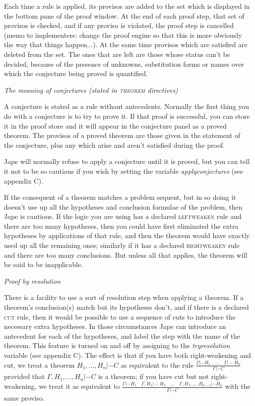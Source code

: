 \documentclass[11pt]{book}
\begin{document}
Each time a rule is applied, its provisos are added to the set which is displayed in the bottom pane of the proof window. At the end of each proof step, that set of provisos is checked, and if any proviso is violated, the proof step is cancelled (memo to implementers: change the proof engine so that this is more obviously the way that things happen...). At the same time provisos which are satisfied are deleted from the set. The ones that are left are those whose status can't be decided, because of the presence of unknowns, substitution forms or names over which the conjecture being proved is quantified.


\textit{The meaning of conjectures (stated in \textsc{theorem} directives)}


A conjecture is stated as a rule without antecedents. Normally the first thing you do with a conjecture is to try to prove it. If that proof is successful, you can store it in the proof store and it will appear in the conjecture panel as a proved theorem. The provisos of a proved theorem are those given in the statement of the conjecture, plus any which arise and aren't satisfied during the proof.


Jape will normally refuse to apply a conjecture until it is proved, but you can tell it not to be so cautious if you wish by setting the variable \textit{applyconjectures} (see appendix C).


If the consequent of a theorem matches a problem sequent, but in so doing it doesn't use up all the hypotheses and conclusion formulae of the problem, then Jape is cautious. If the logic you are using has a declared \textsc{leftweaken} rule and there are too many hypotheses, then you could have first eliminated the extra hypotheses by applications of that rule, and then the theorem would have exactly used up all the remaining ones; similarly if it has a declared \textsc{rightweaken} rule and there are too many conclusions. But unless all that applies, the theorem will be said to be inapplicable.


\textit{Proof by resolution}


There is a facility to use a sort of resolution step when applying a theorem. If a theorem's conclusion(s) match but its hypotheses don't, and if there is a declared \textsc{cut} rule, then it would be possible to use a sequence of cuts to introduce the necessary extra hypotheses. In those circumstances Jape can introduce an antecedent for each of the hypotheses, and label the step with the name of the theorem. This feature is turned on and off by assigning to the \textit{tryresolution} variable (see appendix C). The effect is that if you have both right-weakening and cut, we treat a theorem $H_{1},...,H_{n}  |- C$ as equivalent to the rule $\frac{\Gamma  |- H_{1} \quad ...\quad \Gamma  |- H_{n} }{\Gamma  |- C} $ provided that $\Gamma,H_{1},...,H_{n}  |- C$ is a theorem; if you have cut but not right-weakening, we treat it as equivalent to $\frac{\Gamma  |- H_{1} \quad \Gamma,H_{1}  |- H_{2} \quad ...\quad \Gamma,H_{1},...,H_{n-1}  |- H_{n} }{\Gamma  |- C} $ with the same proviso.
\end{document}
